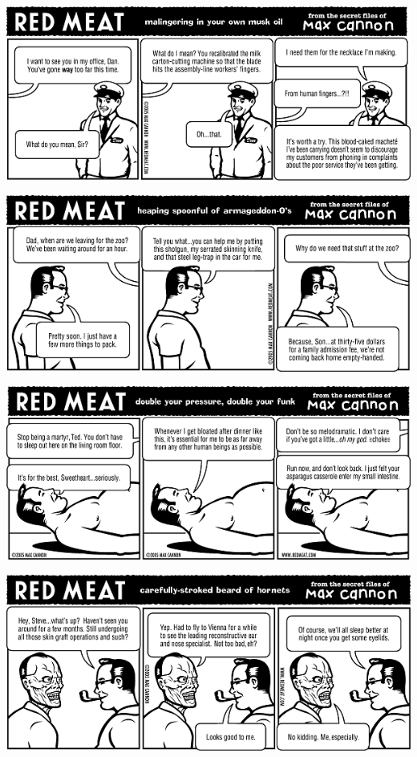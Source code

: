 \documentclass[a4paper,twoside,11pt]{article}
\begin{document}
\includegraphics[width=\textwidth]{redmeat_2005-02-15.png}



\includegraphics[width=\textwidth]{redmeat_2005-02-22.png}



\includegraphics[width=\textwidth]{redmeat_2005-03-01.png}



\includegraphics[width=\textwidth]{redmeat_2005-03-08.png}
\end{document}
